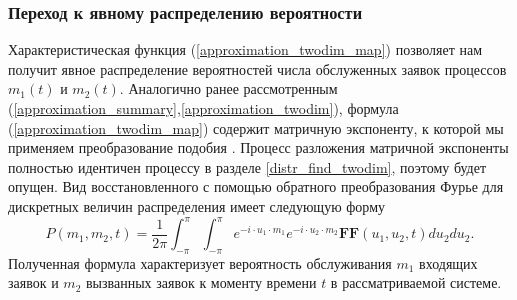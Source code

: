 \subsubsection{Переход к явному распределению вероятности}
Характеристическая функция (\ref{approximation_twodim_map}) позволяет нам получит явное распределение вероятностей числа обслуженных заявок процессов $m_{1}(t)$ и $m_{2}(t)$.
Аналогично ранее рассмотренным (\ref{approximation_summary},\ref{approximation_twodim}), формула (\ref{approximation_twodim_map}) содержит матричную экспоненту, к которой мы применяем преобразование подобия \cite{bronson1991matrix}. Процесс разложения матричной экспоненты полностью идентичен процессу в разделе \ref{distr_find_twodim}, поэтому будет опущен.
Вид восстановленного с помощью обратного преобразования Фурье для дискретных величин распределения имеет следующую форму
\begin{equation*}
	P(m_{1},m_{2},t) = \dfrac{1}{2\pi}\int_{-\pi}^{\pi}\int_{-\pi}^{\pi} e^{-i \cdot u_{1} \cdot m_{1}} e^{-i \cdot u_{2} \cdot m_{2}}\boldsymbol{FF}(u_{1},u_{2},t)du_{2}du_{2}.
\end{equation*}
Полученная формула характеризует вероятность обслуживания $m_{1}$ входящих заявок и $m_{2}$ вызванных заявок к моменту времени $t$ в рассматриваемой системе.

\clearpage